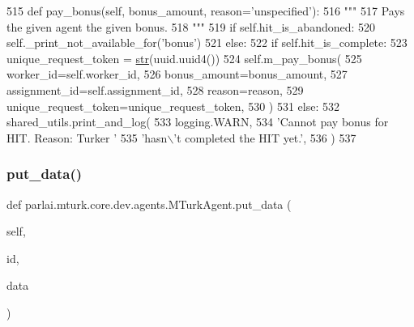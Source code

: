 \begin{DoxyCode}
515     \textcolor{keyword}{def }pay\_bonus(self, bonus\_amount, reason='unspecified'):
516         \textcolor{stringliteral}{"""}
517 \textcolor{stringliteral}{        Pays the given agent the given bonus.}
518 \textcolor{stringliteral}{        """}
519         \textcolor{keywordflow}{if} self.hit\_is\_abandoned:
520             self.\_print\_not\_available\_for(\textcolor{stringliteral}{'bonus'})
521         \textcolor{keywordflow}{else}:
522             \textcolor{keywordflow}{if} self.hit\_is\_complete:
523                 unique\_request\_token = \hyperlink{namespacegenerate__task__READMEs_a5b88452ffb87b78c8c85ececebafc09f}{str}(uuid.uuid4())
524                 self.m\_pay\_bonus(
525                     worker\_id=self.worker\_id,
526                     bonus\_amount=bonus\_amount,
527                     assignment\_id=self.assignment\_id,
528                     reason=reason,
529                     unique\_request\_token=unique\_request\_token,
530                 )
531             \textcolor{keywordflow}{else}:
532                 shared\_utils.print\_and\_log(
533                     logging.WARN,
534                     \textcolor{stringliteral}{'Cannot pay bonus for HIT. Reason: Turker '}
535                     \textcolor{stringliteral}{'hasn\(\backslash\)'t completed the HIT yet.'},
536                 )
537 
\end{DoxyCode}
\mbox{\label{classparlai_1_1mturk_1_1core_1_1dev_1_1agents_1_1MTurkAgent_a2cd8f8cbd48123595dd64371577f2a27}} 
\subsubsection{\texorpdfstring{put\+\_\+data()}{put\_data()}}
{\footnotesize\ttfamily def parlai.\+mturk.\+core.\+dev.\+agents.\+M\+Turk\+Agent.\+put\+\_\+data (\begin{DoxyParamCaption}\item[{}]{self,  }\item[{}]{id,  }\item[{}]{data }\end{DoxyParamCaption})}

